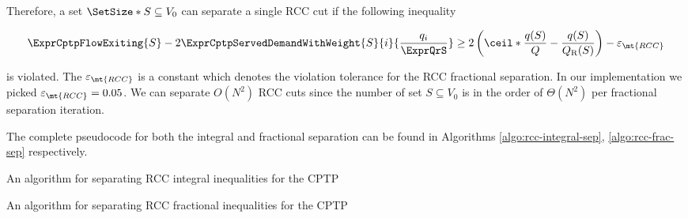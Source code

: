 Therefore, a set $\SetSize*{S} \subseteq V_0$ can separate a single RCC cut if the following inequality

\begin{equation}
	\begin{split}
		\ExprCptpFlowExiting{S} -2 \ExprCptpServedDemandWithWeight{S}{i}{\frac{q_i}{\ExprQrS}}    \ge   2 \left( \ceil*{ \frac{q(S)}{Q}} - \frac{q(S)}{Q_{\mathrm{R}}(S)} \right) - \varepsilon_{\mt{RCC}}
	\end{split}
\end{equation}

is violated.
The $\varepsilon_{\mt{RCC}}$ is a constant which denotes the violation tolerance for the RCC fractional separation.
In our implementation we picked $\varepsilon_{\mt{RCC}} = 0.05$.
We can separate $O(N^2)$ RCC cuts since the number of set $S \subseteq V_0$ is in the order of $\Theta(N^2)$ per fractional separation iteration.

The complete pseudocode for both the integral and fractional separation can be found in Algorithms \ref{algo:rcc-integral-sep}, \ref{algo:rcc-frac-sep} respectively.


\begin{algorithm}
	\caption{An algorithm for separating RCC integral inequalities for the CPTP}
	\label{algo:rcc-integral-sep}
	
\end{algorithm}


\begin{algorithm}
	\caption{An algorithm for separating RCC fractional inequalities for the CPTP}
	\label{algo:rcc-frac-sep}
	
\end{algorithm}
